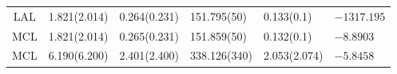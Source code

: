 \documentclass[12pt,a4paper,UTF8,twoside]{book}
\theoremstyle{definition}
\theoremstyle{definition}
\theoremstyle{definition}
\theoremstyle{remark}
\begin{document}
\begin{longtable}[]{@{}clllll@{}}
\begin{minipage}[t]{0.09\columnwidth}
LAL\strut
\end{minipage} & \begin{minipage}[t]{0.15\columnwidth}\raggedright
1.821(2.014)\strut
\end{minipage} & \begin{minipage}[t]{0.15\columnwidth}\raggedright
0.264(0.231)\strut
\end{minipage} & \begin{minipage}[t]{0.15\columnwidth}\raggedright
151.795(50)\strut
\end{minipage} & \begin{minipage}[t]{0.15\columnwidth}\raggedright
0.133(0.1)\strut
\end{minipage} & \begin{minipage}[t]{0.15\columnwidth}\raggedright
\(-1317.195\)\strut
\end{minipage}\tabularnewline
\begin{minipage}[t]{0.09\columnwidth}\centering
MCL\strut
\end{minipage} & \begin{minipage}[t]{0.15\columnwidth}\raggedright
1.821(2.014)\strut
\end{minipage} & \begin{minipage}[t]{0.15\columnwidth}\raggedright
0.265(0.231)\strut
\end{minipage} & \begin{minipage}[t]{0.15\columnwidth}\raggedright
151.859(50)\strut
\end{minipage} & \begin{minipage}[t]{0.15\columnwidth}\raggedright
0.132(0.1)\strut
\end{minipage} & \begin{minipage}[t]{0.15\columnwidth}\raggedright
\(-8.8903\)\strut
\end{minipage}\tabularnewline
\begin{minipage}[t]{0.09\columnwidth}\centering
MCL\strut
\end{minipage} & \begin{minipage}[t]{0.15\columnwidth}\raggedright
6.190(6.200)\strut
\end{minipage} & \begin{minipage}[t]{0.15\columnwidth}\raggedright
2.401(2.400)\strut
\end{minipage} & \begin{minipage}[t]{0.15\columnwidth}\raggedright
338.126(340)\strut
\end{minipage} & \begin{minipage}[t]{0.15\columnwidth}\raggedright
2.053(2.074)\strut
\end{minipage} & \begin{minipage}[t]{0.15\columnwidth}\raggedright
\(-5.8458\)\strut
\end{minipage}\tabularnewline
\bottomrule
\end{longtable}
\end{document}
